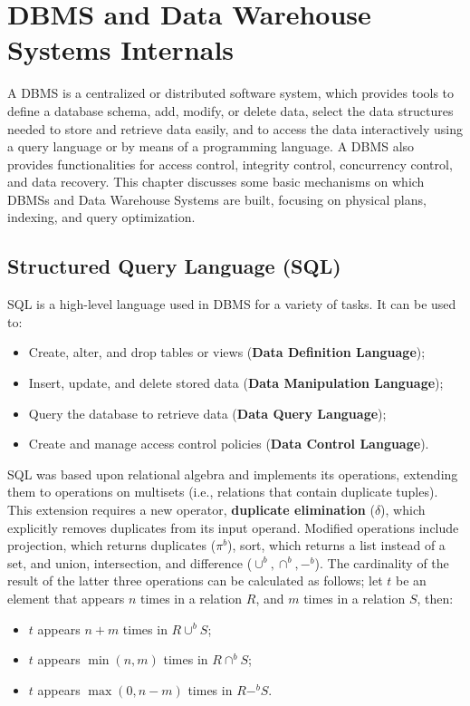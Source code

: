 \chapter{DBMS and Data Warehouse Systems Internals}

A DBMS is a centralized or distributed software system, which provides tools to define a database schema, add, modify, or delete data, select the data structures needed to store and retrieve data easily, and to access the data interactively using a query language or by means of a programming language. A DBMS also provides functionalities for access control, integrity control, concurrency control, and data recovery. This chapter discusses some basic mechanisms on which DBMSs and Data Warehouse Systems are built, focusing on physical plans, indexing, and query optimization.

\section{Structured Query Language (SQL)}

SQL is a high-level language used in DBMS for a variety of tasks. It can be used to:
\begin{itemize}
    \item Create, alter, and drop tables or views (\textbf{Data Definition Language});
    \item Insert, update, and delete stored data (\textbf{Data Manipulation Language});
    \item Query the database to retrieve data (\textbf{Data Query Language});
    \item Create and manage access control policies (\textbf{Data Control Language}).
\end{itemize}
SQL was based upon relational algebra and implements its operations, extending them to operations on multisets (i.e., relations that contain duplicate tuples). This extension requires a new operator, \textbf{duplicate elimination} ($\delta$), which explicitly removes duplicates from its input operand. Modified operations include projection, which returns duplicates ($\pi^b$), sort, which returns a list instead of a set, and union, intersection, and difference ($\cup^b, \cap^b, -^b$). The cardinality of the result of the latter three operations can be calculated as follows; let $t$ be an element that appears $n$ times in a relation $R$, and $m$ times in a relation $S$, then:
\begin{itemize}
    \item $t$ appears $n+m$ times in $R \cup^b S$;
    \item $t$ appears $\min(n,m)$ times in $R \cap^b S$;
    \item $t$ appears $\max(0, n-m)$ times in $R -^b S$.
\end{itemize} 

